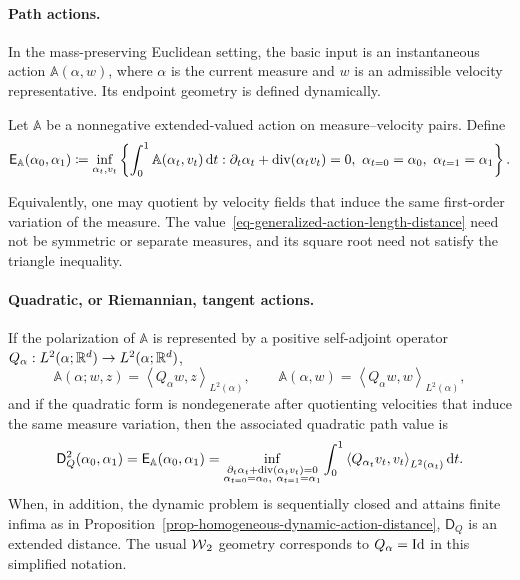 \paragraph{Path actions.}
In the mass-preserving Euclidean setting, the basic input is an instantaneous action $\mathbb A(\alpha,w)$, where \(\alpha\) is the current measure and \(w\) is an admissible velocity representative. Its endpoint geometry is defined dynamically.

\begin{defn}\label{def-generalized-dynamic-action-distance}
Let $\mathbb A$ be a nonnegative extended-valued action on measure--velocity pairs. Define
\begin{equation}\label{eq-generalized-action-length-distance}
\mathsf E_{\mathbb A}(\alpha_0,\alpha_1)
\coloneqq
\inf_{\alpha_t,v_t}
\left\{
\int_0^1 \mathbb A(\alpha_t,v_t)\,\mathrm{d} t
:
\partial_t\alpha_t+
\operatorname{div}(\alpha_t v_t)=0,\
\alpha_{t=0}=\alpha_0,\
\alpha_{t=1}=\alpha_1
\right\}.
\end{equation}
\end{defn}
Equivalently, one may quotient by velocity fields that induce the same first-order variation of the measure. The value~\eqref{eq-generalized-action-length-distance} need not be symmetric or separate measures, and its square root need not satisfy the triangle inequality.

\paragraph{Quadratic, or Riemannian, tangent actions.}
If the polarization of \(\mathbb A\) is represented by a positive self-adjoint operator
\(Q_\alpha:L^2(\alpha;\mathbb{R}^d)\to L^2(\alpha;\mathbb{R}^d)\),
\[
\mathbb A(\alpha;w,z)
=
\left\langle Q_\alpha w,z\right\rangle_{L^2(\alpha)},
\qquad
\mathbb A(\alpha,w)=\left\langle Q_\alpha w,w\right\rangle_{L^2(\alpha)},
\]
and if the quadratic form is nondegenerate after quotienting velocities that induce the same measure variation, then the associated quadratic path value is
\begin{equation}\label{eq-general-quadratic-tangent-action}
\mathsf D_Q^2(\alpha_0,\alpha_1)
=
\mathsf E_{\mathbb A}(\alpha_0,\alpha_1)
=
\inf_{\substack{\partial_t\alpha_t+\operatorname{div}(\alpha_t v_t)=0\\
\alpha_{t=0}=\alpha_0,\ \alpha_{t=1}=\alpha_1}}
\int_0^1
\left\langle Q_{\alpha_t}v_t,v_t\right\rangle_{L^2(\alpha_t)}
\mathrm{d} t.
\end{equation}
When, in addition, the dynamic problem is sequentially closed and attains finite infima as in Proposition~\ref{prop-homogeneous-dynamic-action-distance}, $\mathsf D_Q$ is an extended distance. The usual $\operatorname{\mathcal{W}}_2$ geometry corresponds to $Q_\alpha=\mathrm{Id}$ in this simplified notation.


